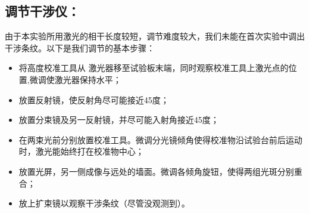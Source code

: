 \documentclass[10pt]{ctexart}
\begin{document}
\subsection{调节干涉仪：}
由于本实验所用激光的相干长度较短，调节难度较大，我们未能在首次实验中调出干涉条纹。以下是我们调节的基本步骤：
\begin{itemize}
    \item 将高度校准工具从
    激光器移至试验板末端，同时观察校准工具上激光点的位置,微调使激光器保持水平；
    \item 放置反射镜，使反射角尽可能接近45度；
    \item 放置分束镜及另一反射镜，并尽可能入射角接近45度；
    \item 在两束光前分别放置校准工具。微调分光镜倾角使得校准物沿试验台前后运动时，激光能始终打在校准物中心；
    \item 放置光屏，另一侧成像与远处的墙面。微调各倾角旋钮，使得两组光斑分别重合；
    \item 放上扩束镜以观察干涉条纹（尽管没观测到）。
\end{itemize}
\end{document}
